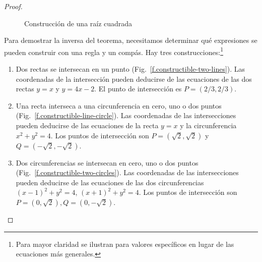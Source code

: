 \begin{proof}
\begin{figure}[b]
\begin{center}
\end{center}
\caption{Construcción de una raíz cuadrada}
\label{f.trisect-square-root}
\end{figure}

Para demostrar la inversa del teorema, necesitamos determinar qué expresiones se pueden construir con una regla y un compás. Hay tres construcciones:\footnote{Para mayor claridad se ilustran para valores específicos en lugar de las ecuaciones más generales.}

\begin{enumerate}
\item Dos rectas se intersecan en un punto (Fig.~\ref{f.constructible-two-lines}). Las coordenadas de la intersección pueden deducirse de las ecuaciones de las dos rectas
$y=x$ y $y=4x-2$. El punto de intersección es $P= (2/3, 2/3)$.

\item Una recta interseca a una circunferencia en cero, uno o dos puntos (Fig.~\ref{f.constructible-line-circle}). Las coordenadas de las intersecciones pueden deducirse de las ecuaciones de la recta $y=x$ y la circunferencia $x^2+y^2=4$. Los puntos de intersección son
$P=(\sqrt{2}, \sqrt{2})$ y $Q=(-\sqrt{2}, -\sqrt{2})$.

\item Dos circunferencias se intersecan en cero, uno o dos puntos (Fig.~\ref{f.constructible-two-circles}). Las coordenadas de las intersecciones pueden deducirse de las ecuaciones de las dos circunferencias $(x-1)^2+y^2=4$, $(x+1)^2+y^2=4$. Los puntos de intersección son $P=(0,\sqrt{2}),Q=(0,-\sqrt{2})$.
\end{enumerate}
\end{proof}

